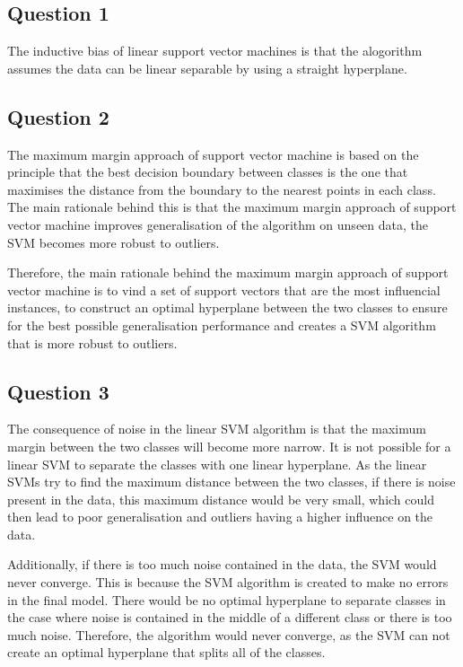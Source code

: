 \documentclass[10pt]{article}
\begin{document}
\subsection*{Question 1}

The inductive bias of linear support vector machines is that the alogorithm
assumes the data can be linear separable by using a straight hyperplane.

\subsection*{Question 2}

The maximum margin approach of support vector machine is based on the principle
that the best decision boundary between classes is the one that maximises the distance from the
boundary to the nearest points in each class. The main rationale behind this is that the
maximum margin approach of support vector machine improves generalisation of the algorithm on unseen
data, the SVM becomes more robust to outliers.

Therefore, the main rationale behind the maximum margin approach of support vector machine
is to vind a set of support vectors that are the most influencial instances, to construct an optimal
hyperplane between the two classes to ensure for the best possible generalisation performance and
creates a SVM algorithm that is more robust to outliers.

\subsection*{Question 3}

The consequence of noise in the linear SVM algorithm is that
the maximum margin between the two classes will become more narrow. It is not possible for a linear
SVM to separate the classes with one linear hyperplane. As the linear SVMs try to find
the maximum distance between the two classes, if there is noise present in the data, this maximum distance
would be very small, which could then lead to poor generalisation and outliers having a higher influence on the data.

Additionally, if there is too much noise contained in the data, the SVM would never converge. This is because
the SVM algorithm is created to make no errors in the final model. There would be no optimal hyperplane to separate classes in the case
where noise is contained in the middle of a different class or there is too much noise. Therefore, the algorithm would never converge, 
as the SVM can not create an optimal hyperplane that splits all of the classes.
\end{document}
